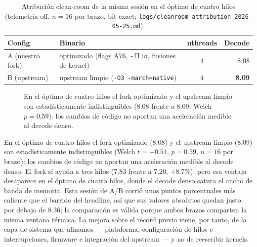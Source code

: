 \documentclass[10pt,a4paper]{article}
\begin{document}
\begin{table}[H]
\centering\small
\caption{Atribución clean-room de la misma sesión en el óptimo de cuatro hilos (telemetría off, $n{=}16$ por brazo, bit-exact; \texttt{logs/cleanroom\_attribution\_2026-05-25.md}).}
\label{tab:attr}
\begin{tabularx}{\textwidth}{@{}lXcr@{}}
\toprule
\textbf{Config} & \textbf{Binario} & \textbf{nthreads} & \textbf{Decode} \\
\midrule
A (nuestro fork) & optimizado (flags A76, \texttt{-flto}, fusiones de kernel) & 4 & 8.08 \\
B (upstream) & upstream limpio (\texttt{-O3 -march=native}) & 4 & \textbf{8.09} \\
\bottomrule
\end{tabularx}
\end{table}

\begin{figure}[H]
\centering
{}
\caption{En el óptimo de cuatro hilos el fork optimizado y el upstream limpio son estadísticamente indistinguibles (8.08 frente a 8.09; Welch $p=0.59$): los cambios de código no aportan una aceleración medible al decode denso.}
\label{fig:attr}
\end{figure}

En el óptimo de cuatro hilos el fork optimizado (8.08) y el upstream limpio (8.09) son estadísticamente indistinguibles (Welch $t={-}0.54$, $p=0.59$, $n{=}16$ por brazo): los cambios de código no aportan una aceleración medible al decode denso. El fork sí ayuda a tres hilos (7.83 frente a 7.20, $+8.7\%$), pero esa ventaja desaparece en el óptimo de cuatro hilos, donde el decode denso satura el ancho de banda de memoria. Esta sesión de A/B corrió unos puntos porcentuales más caliente que el barrido del headline, así que sus valores absolutos quedan justo por debajo de 8.36; la comparación es válida porque ambos brazos comparten la misma ventana térmica. La mejora sobre el récord previo viene, por tanto, de la capa de sistema que afinamos --- plataforma, configuración de hilos e interrupciones, firmware e integración del upstream --- y no de reescribir kernels.
\end{document}
